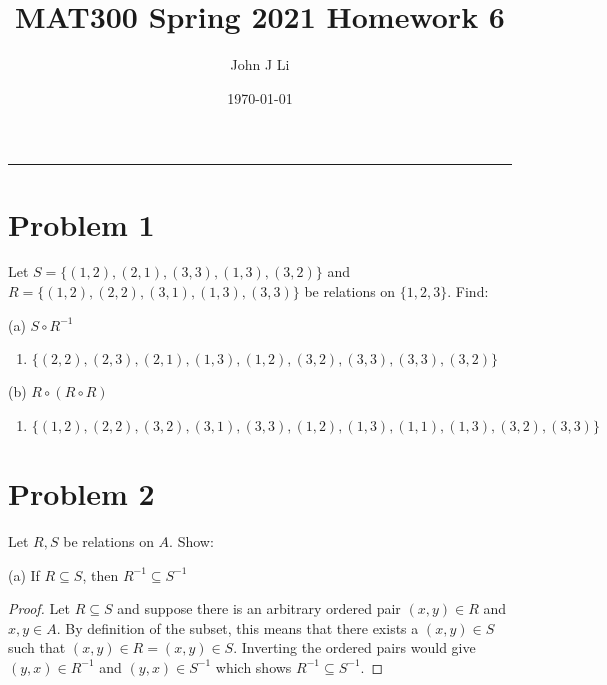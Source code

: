 \documentclass{article}
\title{MAT300 Spring 2021 Homework 6}
\date{\today}
\author{John J Li}
\begin{document}
    \maketitle
    \thispagestyle{empty}
    \noindent\rule{\textwidth}{0.8pt}


    \section*{Problem 1}

    Let $S = \{(1,2),(2,1),(3,3),(1,3),(3,2)\}$ and $R=\{(1,2),(2,2),(3,1),(1,3),(3,3)\}$
    be relations on $\{1,2,3\}$. Find:

    (a) $S\circ R^{-1}$

    \begin{enumerate}[label={\bfseries Solution:}, leftmargin=*]
        \item $\{(2,2),(2,3),(2,1),(1,3),(1,2),(3,2),(3,3),(3,3),(3,2)\}$
    \end{enumerate}

    (b) $R\circ (R\circ R)$

    \begin{enumerate}[label={\bfseries Solution:}, leftmargin=*]
        \item $\{(1,2),(2,2),(3,2),(3,1),(3,3),(1,2),(1,3),(1,1),(1,3),(3,2),(3,3)\}$
    \end{enumerate}


    \section*{Problem 2}

    Let $R,S$ be relations on $A$. Show:

    (a) If $R\subseteq S$, then $R^{-1}\subseteq S^{-1}$

    \begin{proof}
        Let $R\subseteq S$ and suppose there is an arbitrary ordered pair $(x,y)\in R$ and $x,y\in A$.
        By definition of the subset, this means that there exists a $(x,y)\in S$ such that
        $(x,y)\in R = (x,y)\in S$.
        Inverting the ordered pairs would give $(y,x)\in R^{-1}$ and $(y,x)\in S^{-1}$ which
        shows $R^{-1}\subseteq S^{-1}$.
    \end{proof}
\end{document}
